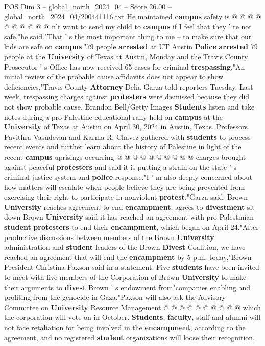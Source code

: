 \begin{textsample}{POS Dim 3 – global\_north\_2024\_04 – Score 26.00 – global\_north\_2024\_04/200441116.txt}
He maintained \textbf{campus} safety is @ @ @ @ @ @ @ @ @ @ n't want to send my child to \textbf{campus} if I feel that they ' re not safe,"he said."That ' s the most important thing to me -- to make sure that our kids are safe on \textbf{campus}."79 people \textbf{arrested} at UT Austin \textbf{Police} \textbf{arrested} 79 people at the \textbf{University} of Texas at Austin, Monday and the Travis County Prosecutor ' s Office has now received 65 cases for criminal \textbf{trespassing}."An initial review of the probable cause affidavits does not appear to show deficiencies,"Travis County \textbf{Attorney} Delia Garza told reporters Tuesday.
Last week, trespassing charges against \textbf{protesters} were dismissed because they did not show probable cause.
Brandon Bell/Getty Images \textbf{Students} listen and take notes during a pro-Palestine educational rally held on \textbf{campus} at the \textbf{University} of Texas at Austin on April 30, 2024 in Austin, Texas.
Professors Pavithra Vasudevan and Karma R.
Chavez gathered with \textbf{students} to process recent events and further learn about the history of Palestine in light of the recent \textbf{campus} uprisings occurring @ @ @ @ @ @ @ @ @ @ charges brought against peaceful \textbf{protesters} and said it is putting a strain on the state ' s criminal justice system and \textbf{police} response."I ' m also deeply concerned about how matters will escalate when people believe they are being prevented from exercising their right to participate in nonviolent \textbf{protest},"Garza said.
Brown \textbf{University} reaches agreement to end \textbf{encampment}, agrees to \textbf{divestment} sit-down Brown \textbf{University} said it has reached an agreement with pro-Palestinian \textbf{student} \textbf{protesters} to end their \textbf{encampment}, which began on April 24."After productive discussions between members of the Brown \textbf{University} administration and \textbf{student} leaders of the Brown \textbf{Divest} Coalition, we have reached an agreement that will end the \textbf{encampment} by 5 p.m. today,"Brown President Christina Paxson said in a statement.
Five \textbf{students} have been invited to meet with five members of the Corporation of Brown \textbf{University} to make their arguments to \textbf{divest} Brown ' s endowment from"companies enabling and profiting from the genocide in Gaza."Paxson will also ask the Advisory Committee on \textbf{University} Resource Management @ @ @ @ @ @ @ @ @ @ which the corporation will vote on in October. \textbf{Students}, \textbf{faculty}, staff and alumni will not face retaliation for being involved in the \textbf{encampment}, according to the agreement, and no registered \textbf{student} organizations will loose their recognition.

\end{textsample}
